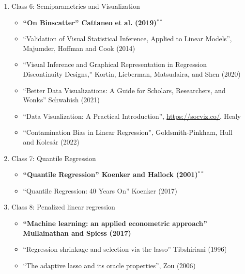 \documentclass[11pt, a4paper]{article}
\begin{document}
\begin{enumerate}
\begin{enumerate}
\begin{itemize}
    \item ``Robust Inference with multiway clustering'' Cameron et al. (2011)
    \item ``Estimating standard errors in finance panel data sets: Comparing approaches'' Petersen (2009)
    \item  ``Sampling-based vs. Design-based Uncertainty in Regression Analysis.'' Abadie et al. (2019)
    \item  ``Using Wasserstein Generative Adversarial Networks for the Design of Monte Carlo Simulations'' Athey et al.
    \end{itemize}
  \item Class 6: Semiparametrics and Visualization
    \begin{itemize}
    \item \textbf{``On Binscatter'' Cattaneo et al. (2019)}$^{**}$
    \item ``Validation of Visual Statistical Inference, Applied to Linear Models'', Majumder, Hoffman and Cook (2014)
    \item ``Visual Inference and Graphical Representation in Regression Discontinuity Designs,'' Kortin, Lieberman, Matsudaira, and Shen (2020)
    \item ``Better Data Visualizations: A Guide for Scholars, Researchers, and Wonks'' Schwabish (2021)
    \item ``Data Visualization: A Practical Introduction'', \url{https://socviz.co/}, Healy
    \item ``Contamination Bias in Linear Regression'', Goldsmith-Pinkham, Hull and Koles\'ar (2022)
    \end{itemize}
  \item Class 7: Quantile Regression
    \begin{itemize}
    \item \textbf{``Quantile Regression'' Koenker and Hallock (2001)}$^{**}$
    \item ``Quantile Regression: 40 Years On'' Koenker (2017)
    \end{itemize}
  \item Class 8: Penalized linear regression
    \begin{itemize}
      \item \textbf{``Machine learning: an applied econometric approach'' Mullainathan and Spiess (2017)}
    \item ``Regression shrinkage and selection via the lasso'' Tibshiriani (1996)
    \item ``The adaptive lasso and its oracle properties'', Zou (2006)

\end{itemize}
\end{enumerate}
\end{enumerate}
\end{document}
